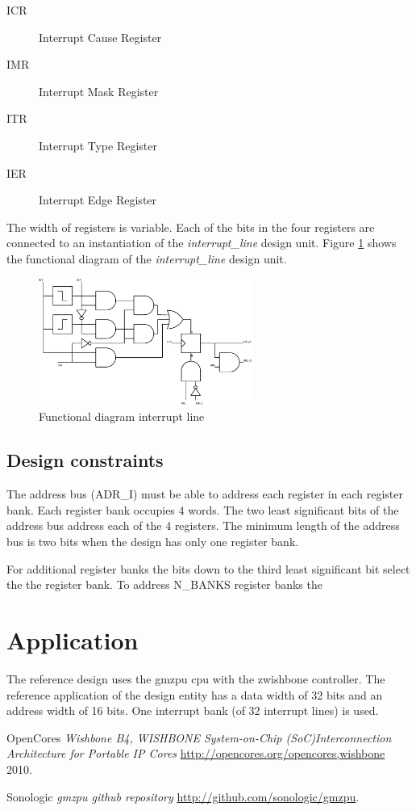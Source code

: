 \documentclass[a4paper,twocolumn,12pt]{article}
\begin{document}
\begin{description}
    \item[ICR] Interrupt Cause Register
    \item[IMR] Interrupt Mask Register
    \item[ITR] Interrupt Type Register
    \item[IER] Interrupt Edge Register
\end{description}    

The width of registers is variable. Each of the bits in the four registers are connected to an instantiation of the \emph{interrupt\_line} design unit. Figure \ref{fig:interrupt_line} shows the functional diagram of the \emph{interrupt\_line} design unit.

\begin{figure}[h]
    \centering
    \includegraphics[width=7cm]{pic_interrupt_line}
    \caption{Functional diagram interrupt line}
    \label{fig:interrupt_line}
\end{figure}

\subsection{Design constraints}

The address bus (ADR\_I) must be able to address each register in each register bank. Each register bank occupies 4 words. The two least significant bits of the address bus address each of the 4 registers. The minimum length of the address bus is two bits when the design has only one register bank.

For additional register banks the bits down to the third least significant bit select the the register bank. To address N\_BANKS register banks the 

\section{Application}

The reference design uses the gmzpu \cite{gmzpu} cpu with the zwishbone controller. The reference application of the design entity has a data width of 32 bits and an address width of 16 bits. One interrupt bank (of 32 interrupt lines) is used.

\begin{thebibliography}{9}

 OpenCores \emph{Wishbone B4, WISHBONE System-on-Chip (SoC)Interconnection Architecture for Portable IP Cores} \url{http://opencores.org/opencores,wishbone} 2010.

 Sonologic \emph{gmzpu github repository} \url{http://github.com/sonologic/gmzpu}.
\end{thebibliography}
\end{document}
